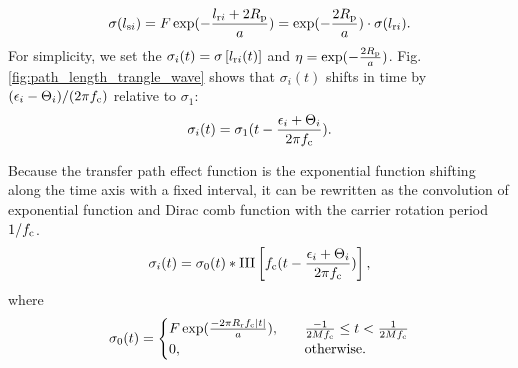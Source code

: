 \documentclass[a4paper,fleqn]{cas-sc}%
\begin{document}
\begin{equation}
    \sigma (l_{{\rm s}i})=F\exp(-\frac{l_{{\rm r}i}+2 R_{\rm p}}{a})=\exp(-\frac{2 R_{\rm p}}{a}) \cdot \sigma(l_{{\rm r}i}).
\end{equation}
For simplicity, we set the $\sigma_i(t)=\sigma\left[l_{{\rm r}i}(t)\right]$ and $\eta=\exp(-\frac{2 R_{\rm p}}{a})$. Fig. \ref{fig:path_length_trangle_wave} shows that $\sigma_{i}(t)$ shifts in time by $(\epsilon_i-\Theta_i)/(2 \pi f_{\rm c})$ relative to $\sigma_1$:
\begin{equation}
    \sigma_{i}(t)=\sigma_{1}(t-\frac{\epsilon_i+\Theta_i}{2 \pi f_{\rm c}}).
\end{equation}
\par Because the transfer path effect function is the exponential function shifting along the time axis with a fixed interval, it can be rewritten as the convolution of exponential function and Dirac comb function with the carrier rotation period $1/f_{\rm c}$.
\begin{equation}
    \sigma_i(t)=\sigma_0(t) \ast \operatorname{III}\left[f_{\rm c} (t - \frac{\epsilon_i+\Theta_i}{2 \pi f_{\rm c}})\right],\label{eq:transfer_path_convolution_form}
\end{equation}
where
\begin{equation}
    \sigma_0(t)=\begin{cases}F \exp(\frac{- 2 \pi R_{\rm r} f_{\rm c} \left|t\right|}{a}),\quad &\frac{-1}{2 M f_{\rm c}} \leq t < \frac{1}{2 M f_{\rm c}}\\
        0, &\text{otherwise}.
    \end{cases}\label{eq:tranfer_path_time_shape}
\end{equation}
\end{document}
